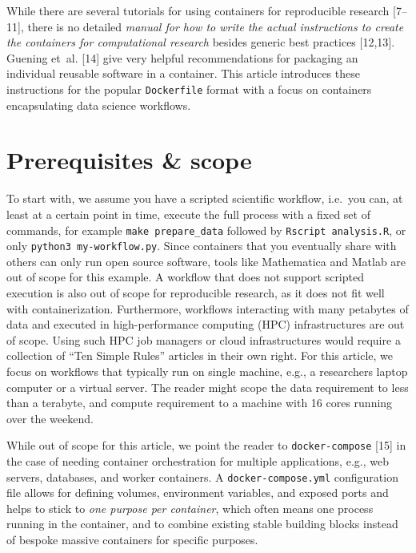 \documentclass[10pt,letterpaper]{article}
\begin{document}
While there are several tutorials for using containers for reproducible
research {[}7--11{]}, there is no detailed \emph{manual for how to write
the actual instructions to create the containers for computational
research} besides generic best practices {[}12,13{]}. Guening et~al.
{[}14{]} give very helpful recommendations for packaging an individual
reusable software in a container. This article introduces these
instructions for the popular \texttt{Dockerfile} format with a focus on
containers encapsulating data science workflows.

\hypertarget{prerequisites-scope}{%
\section{Prerequisites \& scope}\label{prerequisites-scope}}

To start with, we assume you have a scripted scientific workflow,
i.e.~you can, at least at a certain point in time, execute the full
process with a fixed set of commands, for example
\texttt{make\ prepare\_data} followed by \texttt{Rscript\ analysis.R},
or only \texttt{python3\ my-workflow.py}. Since containers that you
eventually share with others can only run open source software, tools
like Mathematica and Matlab are out of scope for this example. A
workflow that does not support scripted execution is also out of scope
for reproducible research, as it does not fit well with
containerization. Furthermore, workflows interacting with many petabytes
of data and executed in high-performance computing (HPC) infrastructures
are out of scope. Using such HPC job managers or cloud infrastructures
would require a collection of ``Ten Simple Rules'' articles in their own
right. For this article, we focus on workflows that typically run on
single machine, e.g., a researchers laptop computer or a virtual server.
The reader might scope the data requirement to less than a terabyte, and
compute requirement to a machine with 16 cores running over the weekend.

While out of scope for this article, we point the reader to
\texttt{docker-compose} {[}15{]} in the case of needing container
orchestration for multiple applications, e.g., web servers, databases,
and worker containers. A \texttt{docker-compose.yml} configuration file
allows for defining volumes, environment variables, and exposed ports
and helps to stick to \emph{one purpose per container}, which often
means one process running in the container, and to combine existing
stable building blocks instead of bespoke massive containers for
specific purposes.
\end{document}

